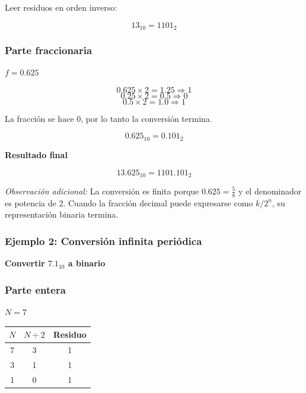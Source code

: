 \documentclass[12pt,twoside]{book}
\begin{document}
						\noindent
						Leer residuos en orden inverso:
						
						\[
						13_{10} = 1101_2
						\]
						
						\subsubsection*{Parte fraccionaria}
						
						\noindent
						$f = 0.625$
						
						\[
						0.625 \times 2 = 1.25 \Rightarrow 1
						\]
						\[
						0.25 \times 2 = 0.5 \Rightarrow 0
						\]
						\[
						0.5 \times 2 = 1.0 \Rightarrow 1
						\]
						
						\noindent
						La fracción se hace 0, por lo tanto la conversión termina.
						
						\[
						0.625_{10} = 0.101_2
						\]
						
						\noindent
						\textbf{Resultado final}
						
						\[
						13.625_{10} = 1101.101_2
						\]
						
						\noindent
						\emph{Observación adicional:} La conversión es finita porque $0.625 = \frac{5}{8}$ y el denominador es potencia de 2. Cuando la fracción decimal puede expresarse como $k/2^n$, su representación binaria termina.
						
						\subsubsection*{Ejemplo 2: Conversión infinita periódica}
						\noindent
						\textbf{Convertir $7.1_{10}$ a binario}
						
						\subsubsection*{Parte entera}
						
						\noindent
						$N = 7$
						
						\begin{center}
							\begin{tabular}{c|c|c}
								$N$ & $N \div 2$ & Residuo \\
								\hline
								7 & 3 & 1 \\
								3 & 1 & 1 \\
								1 & 0 & 1 \\
							\end{tabular}
						\end{center}
						
\end{document}

